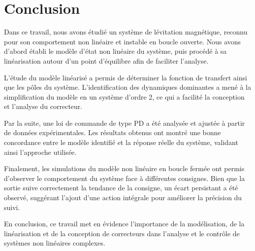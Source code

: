 \section{Conclusion}
Dans ce travail, nous avons étudié un système de lévitation magnétique, reconnu pour son comportement non linéaire et instable en boucle ouverte. Nous avons d’abord établi le modèle d’état non linéaire du système, puis procédé à sa linéarisation autour d’un point d’équilibre afin de faciliter l’analyse.

L’étude du modèle linéarisé a permis de déterminer la fonction de transfert ainsi que les pôles du système. L’identification des dynamiques dominantes a mené à la simplification du modèle en un système d’ordre 2, ce qui a facilité la conception et l’analyse du correcteur.

Par la suite, une loi de commande de type PD a été analysée et ajustée à partir de données expérimentales. Les résultats obtenus ont montré une bonne concordance entre le modèle identifié et la réponse réelle du système, validant ainsi l’approche utilisée.

Finalement, les simulations du modèle non linéaire en boucle fermée ont permis d’observer le comportement du système face à différentes consignes. Bien que la sortie suive correctement la tendance de la consigne, un écart persistant a été observé, suggérant l’ajout d’une action intégrale pour améliorer la précision du suivi.

En conclusion, ce travail met en évidence l’importance de la modélisation, de la linéarisation et de la conception de correcteurs dans l’analyse et le contrôle de systèmes non linéaires complexes.\label{sec:conclusion}

